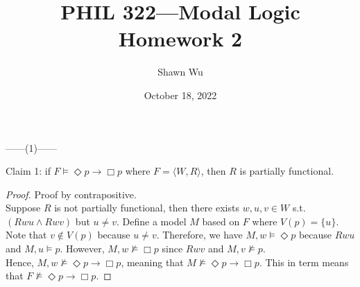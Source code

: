\documentclass[12pt]{article}
\title{PHIL 322---Modal Logic \\Homework 2}
\author{Shawn Wu}
\date{October 18, 2022}
\newcommand{\B}{\Box}
\newcommand{\D}{\Diamond}
\newcommand{\ns}{\nvDash}
\begin{document}
\maketitle
\noindent
\begin{center}
    ------(1)------
\end{center}
Claim 1: if $F \vDash \D p \rightarrow \B p$ where $F = \langle W, R \rangle$, then $R$ is partially functional. 
\begin{proof} Proof by contrapositive.\\
    Suppose $R$ is not partially functional, then there exists $w, u, v \in W$ s.t. $(Rwu \land Rwv)$ but $u \neq v$.
    Define a model $M$ based on $F$ where $V(p) = \{ u \}$. 
    Note that $v \notin V(p)$ because $u \neq v$.
    Therefore, we have $M, w \vDash \D p$ because $Rwu$ and $M, u \vDash p$.
    However, $M, w \nvDash \B p$ since $Rwv$ and $M, v \ns p$.\\
    Hence, $M, w \ns \D p \to \B p$, meaning that $M \ns \D p \to \B p$.
    This in term means that $F \ns \D p \to \B p$.
\end{proof}
\end{document}
